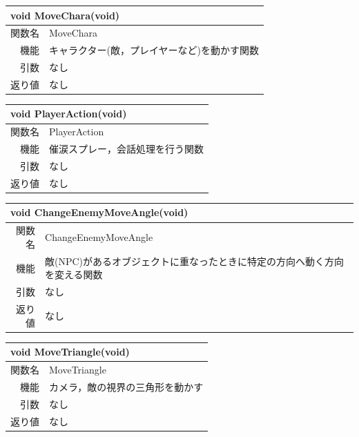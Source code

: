 \documentclass{jarticle}
\begin{document}
\begin{table}[H]
\begin{tabular}{|r|l|}
\hline
\multicolumn{2}{|l|}{void MoveChara(void)}       \\ \hline
  関数名           & MoveChara \\ \hline
機能     & キャラクター(敵，プレイヤーなど)を動かす関数 \\
引数     & なし \\
返り値   & なし \\ \hline
\end{tabular}
\end{table}


\begin{table}[H]
\begin{tabular}{|r|l|}
\hline
\multicolumn{2}{|l|}{void PlayerAction(void)}       \\ \hline
関数名           & PlayerAction \\ \hline
機能     & 催涙スプレー，会話処理を行う関数 \\
引数     & なし \\
返り値   & なし \\ \hline
\end{tabular}
\end{table}


\begin{table}[H]
\begin{tabular}{|r|l|}
\hline
\multicolumn{2}{|l|}{void ChangeEnemyMoveAngle(void)}       \\ \hline
関数名           & ChangeEnemyMoveAngle \\ \hline
  機能     & 敵(NPC)があるオブジェクトに重なったときに特定の方向へ動く方向を変える関数 \\
引数     & なし \\
返り値   & なし \\ \hline
\end{tabular}
\end{table}


\begin{table}[H]
\begin{tabular}{|r|l|}
\hline
\multicolumn{2}{|l|}{void MoveTriangle(void)}       \\ \hline
関数名           & MoveTriangle \\ \hline
機能     & カメラ，敵の視界の三角形を動かす \\
引数     & なし \\
返り値   & なし \\ \hline
\end{tabular}
\end{table}
\end{document}
